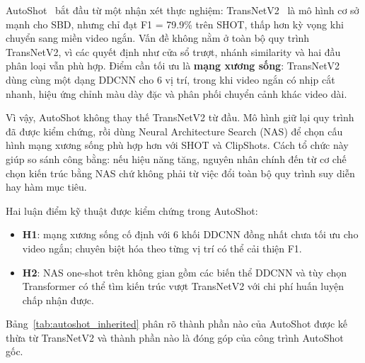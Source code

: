 AutoShot~\cite{zhu2023autoshot} bắt đầu từ một nhận xét thực nghiệm: TransNetV2~\cite{soucek2020transnetv2} là mô hình cơ sở mạnh cho SBD, nhưng chỉ đạt F1 = 79.9\% trên SHOT, thấp hơn kỳ vọng khi chuyển sang miền video ngắn. Vấn đề không nằm ở toàn bộ quy trình TransNetV2, vì các quyết định như cửa sổ trượt, nhánh similarity và hai đầu phân loại vẫn phù hợp. Điểm cần tối ưu là \textbf{mạng xương sống}: TransNetV2 dùng cùng một dạng DDCNN cho 6 vị trí, trong khi video ngắn có nhịp cắt nhanh, hiệu ứng chỉnh màu dày đặc và phân phối chuyển cảnh khác video dài.

Vì vậy, AutoShot không thay thế TransNetV2 từ đầu. Mô hình giữ lại quy trình đã được kiểm chứng, rồi dùng Neural Architecture Search (NAS) để chọn cấu hình mạng xương sống phù hợp hơn với SHOT và ClipShots. Cách tổ chức này giúp so sánh công bằng: nếu hiệu năng tăng, nguyên nhân chính đến từ cơ chế chọn kiến trúc bằng NAS chứ không phải từ việc đổi toàn bộ quy trình suy diễn hay hàm mục tiêu.

Hai luận điểm kỹ thuật được kiểm chứng trong AutoShot:
\begin{itemize}
    \item \textbf{H1}: mạng xương sống cố định với 6 khối DDCNN đồng nhất chưa tối ưu cho video ngắn; chuyên biệt hóa theo từng vị trí có thể cải thiện F1.
    \item \textbf{H2}: NAS one-shot trên không gian gồm các biến thể DDCNN và tùy chọn Transformer có thể tìm kiến trúc vượt TransNetV2 với chi phí huấn luyện chấp nhận được.
\end{itemize}

Bảng~\ref{tab:autoshot_inherited} phân rõ thành phần nào của AutoShot được kế thừa từ TransNetV2 và thành phần nào là đóng góp của công trình AutoShot gốc.

